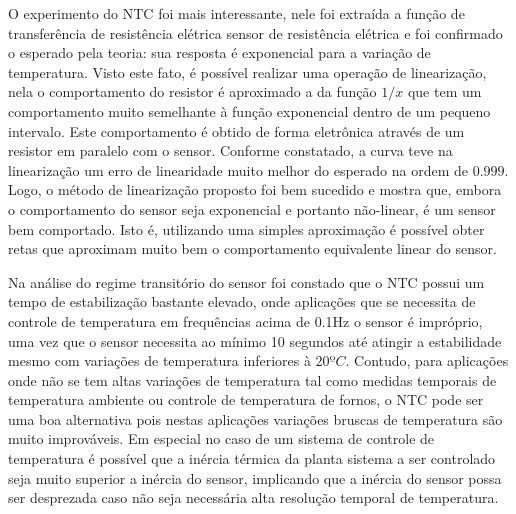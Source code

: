 \documentclass[a4paper]{instrumentacao}
\begin{document}
O experimento do NTC foi mais interessante, nele foi extraída a função de transferência de resistência elétrica sensor de resistência elétrica e foi confirmado o esperado pela teoria: sua resposta é exponencial para a variação de temperatura. Visto este fato, é possível realizar uma operação de linearização, nela o comportamento do resistor é aproximado a da função $1/x$ que tem um comportamento muito semelhante à função exponencial dentro de um pequeno intervalo. Este comportamento é obtido de forma eletrônica através de um resistor em paralelo com o sensor. Conforme constatado, a curva teve na linearização um erro de linearidade muito melhor do esperado na ordem de $0.999$. Logo, o método de linearização proposto foi bem sucedido e mostra que, embora o comportamento do sensor seja exponencial e portanto não-linear, é um sensor bem comportado. Isto é, utilizando uma simples aproximação é possível obter retas que aproximam muito bem o comportamento equivalente linear do sensor.

Na análise do regime transitório do sensor foi constado que o NTC possui um tempo de estabilização bastante elevado, onde aplicações que se necessita de controle de temperatura em frequências acima de 0.1Hz o sensor é impróprio, uma vez que o sensor necessita ao mínimo 10 segundos até atingir a estabilidade mesmo com variações de temperatura inferiores à $20ºC$. Contudo, para aplicações onde não se tem altas variações de temperatura tal como medidas temporais de temperatura ambiente ou controle de temperatura de fornos, o NTC pode ser uma boa alternativa pois nestas aplicações variações bruscas de temperatura são muito improváveis. Em especial no caso de um sistema de controle de temperatura é possível que a inércia térmica da planta sistema a ser controlado seja muito superior a inércia do sensor, implicando que a inércia do sensor possa ser desprezada caso não seja necessária alta resolução temporal de temperatura.


\end{document}
